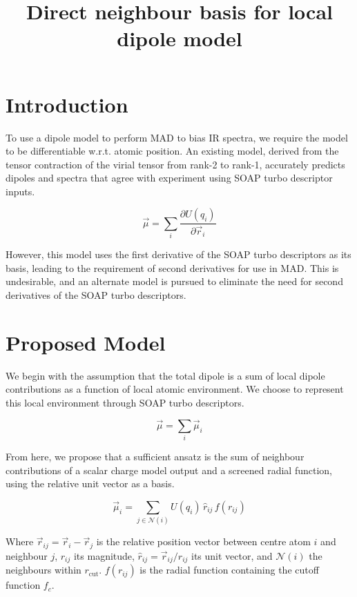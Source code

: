 \documentclass[11pt,a4paper]{article}
\title{Direct neighbour basis for local dipole model}
\begin{document}
\maketitle
\section{Introduction}
To use a dipole model to perform MAD to bias IR spectra, we require the model to be differentiable w.r.t. atomic position. An existing model, derived from the tensor contraction of the virial tensor from rank-2 to rank-1, accurately predicts dipoles and spectra that agree with experiment using SOAP turbo descriptor inputs.

\begin{equation}
    \vec{\mu} = \sum_i \frac{\partial{U(q_i)}}{\partial{\vec r_{i}}}
    \label{eq:derivative-model}
\end{equation}

However, this model uses the first derivative of the SOAP turbo descriptors as its basis, leading to the requirement of second derivatives for use in MAD. This is undesirable, and an alternate model is pursued to eliminate the need for second derivatives of the SOAP turbo descriptors.

\section{Proposed Model}
We begin with the assumption that the total dipole is a sum of local dipole contributions as a function of local atomic environment. We choose to represent this local environment through SOAP turbo descriptors.

\begin{equation}
    \vec{\mu} = \sum_i \vec{\mu}_i
\end{equation}

From here, we propose that a sufficient ansatz is the sum of neighbour contributions of a scalar charge model output and a screened radial function, using the relative unit vector as a basis.

\begin{equation}
    \vec{\mu}_i = \sum_{j \in \mathcal{N}(i)} U(q_i)\, \hat{r}_{ij}\, f(r_{ij})
    \label{eq:local}
\end{equation}

Where $\vec{r}_{ij} = \vec{r}_i - \vec{r}_j$ is the relative position vector between centre atom $i$ and neighbour $j$, $r_{ij}$ its magnitude, $\hat{r}_{ij} = \vec{r}_{ij}/r_{ij}$ its unit vector, and $\mathcal{N}(i)$ the neighbours within $r_{\mathrm{cut}}$. $f(r_{ij})$ is the radial function containing the cutoff function $f_c$.
\end{document}
